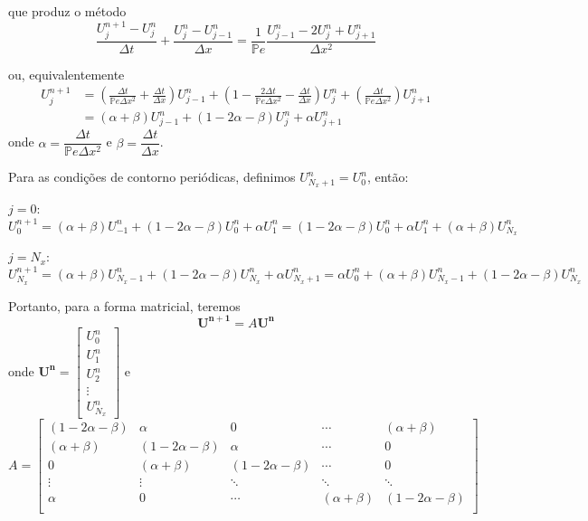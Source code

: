 \documentclass[12pt, a4paper]{article}
\newcommand{\bb}[1]{\mathbb{#1}}
\renewcommand{\bf}[1]{\mathbf{#1}}
\newcommand{\D}[1]{\Delta#1}
\begin{document}
    que produz o método
    \begin{equation}
        \frac{U_j^{n+1}-U_j^n}{\D{t}} + \frac{U_j^n-U_{j-1}^n}{\D{x}} = \frac{1}{\bb{P}e} \frac{U_{j-1}^n-2U_j^n+U_{j+1}^n}{\D{x}^2}
    \end{equation}

    ou, equivalentemente
    \begin{equation}
        \begin{split}
            U_j^{n+1} &= \left(\frac{\D{t}}{\bb{P}e\D{x}^2}+\frac{\D{t}}{\D{x}}\right)U_{j-1}^n + \left(1-\frac{2\D{t}}{\bb{P}e\D{x}^2}-\frac{\D{t}}{\D{x}}\right)U_j^n + \left(\frac{\D{t}}{\bb{P}e\D{x}^2}\right)U_{j+1}^n\\[.2cm]
            &= (\alpha+\beta)U_{j-1}^n + (1-2\alpha-\beta)U_j^n + \alpha U_{j+1}^n
        \end{split}
    \end{equation}
    onde $\alpha = \dfrac{\D{t}}{\bb{P}e\D{x^2}}$ e $\beta = \dfrac{\D{t}}{\D{x}}$.

    \vspace{.3cm}

    Para as condições de contorno periódicas, definimos $U_{N_x+1}^n = U_0^n$, então:

    $j = 0$:
    \[U_0^{n+1} = (\alpha+\beta)U_{-1}^n + (1-2\alpha-\beta)U_0^n + \alpha U_{1}^n = (1-2\alpha-\beta)U_0^n + \alpha U_{1}^n + (\alpha+\beta)U_{N_x}^n\]

    $j = N_x$:
    \[U_{N_x}^{n+1} = (\alpha+\beta)U_{N_x-1}^n + (1-2\alpha-\beta)U_{N_x}^n + \alpha U_{N_x+1}^n = \alpha U_{0}^n + (\alpha+\beta)U_{N_x-1}^n + (1-2\alpha-\beta)U_{N_x}^n\]

    Portanto, para a forma matricial, teremos
    \begin{equation}
        \bf{U^{n+1}} = A\bf{U^n}
    \end{equation}
    onde $\bf{U^n} = \begin{bmatrix}
        U_0^n \\ U_1^n \\ U_2^n \\ \vdots \\ U_{N_x}^n
    \end{bmatrix}$ e $A = \begin{bmatrix}
        (1-2\alpha-\beta) & \alpha & 0 & \cdots & (\alpha+\beta)\\
        (\alpha+\beta) & (1-2\alpha-\beta) & \alpha & \cdots & 0\\
        0 & (\alpha+\beta) & (1-2\alpha-\beta) & \cdots & 0\\
        \vdots & \vdots & \ddots & \ddots & \ddots\\
        \alpha & 0 & \cdots & (\alpha+\beta) & (1-2\alpha-\beta)\\
    \end{bmatrix}$
\end{document}
